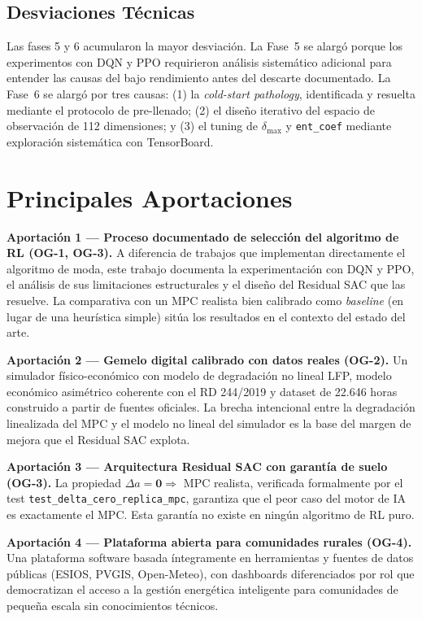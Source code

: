 \documentclass[12pt, a4paper, twoside]{report}
\begin{document}
\section{Desviaciones Técnicas}

Las fases 5 y 6 acumularon la mayor desviación. La Fase~5 se alargó porque
los experimentos con DQN y PPO requirieron análisis sistemático adicional
para entender las causas del bajo rendimiento antes del descarte documentado.
La Fase~6 se alargó por tres causas: (1) la \textit{cold-start pathology},
identificada y resuelta mediante el protocolo de pre-llenado; (2) el diseño
iterativo del espacio de observación de 112 dimensiones; y (3) el tuning de
$\delta_{\max}$ y \texttt{ent\_coef} mediante exploración sistemática con
TensorBoard.

\chapter{Principales Aportaciones}
\label{chap:aportaciones}

\textbf{Aportación 1 — Proceso documentado de selección del algoritmo de RL
(OG-1, OG-3).} A diferencia de trabajos que implementan directamente el
algoritmo de moda, este trabajo documenta la experimentación con DQN y PPO,
el análisis de sus limitaciones estructurales y el diseño del Residual SAC
que las resuelve. La comparativa con un MPC realista bien calibrado como
\textit{baseline} (en lugar de una heurística simple) sitúa los resultados
en el contexto del estado del arte.

\textbf{Aportación 2 — Gemelo digital calibrado con datos reales (OG-2).}
Un simulador físico-económico con modelo de degradación no lineal LFP,
modelo económico asimétrico coherente con el RD 244/2019 y dataset de
22.646 horas construido a partir de fuentes oficiales. La brecha intencional
entre la degradación linealizada del MPC y el modelo no lineal del simulador
es la base del margen de mejora que el Residual SAC explota.

\textbf{Aportación 3 — Arquitectura Residual SAC con garantía de suelo (OG-3).}
La propiedad $\Delta a = \mathbf{0} \Rightarrow$ MPC realista, verificada
formalmente por el test \texttt{test\_delta\_cero\_replica\_mpc}, garantiza que
el peor caso del motor de IA es exactamente el MPC. Esta garantía no existe en
ningún algoritmo de RL puro.

\textbf{Aportación 4 — Plataforma abierta para comunidades rurales (OG-4).}
Una plataforma software basada íntegramente en herramientas y fuentes de datos
públicas (ESIOS, PVGIS, Open-Meteo), con dashboards diferenciados por rol que
democratizan el acceso a la gestión energética inteligente para comunidades de
pequeña escala sin conocimientos técnicos.
\end{document}
